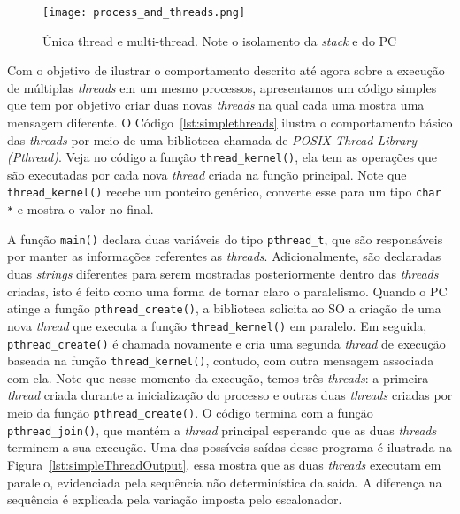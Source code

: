 \begin{figure}[!h]
  \centering
  \texttt{[image: process\_and\_threads.png]}
  \caption{Única thread e multi-thread. Note o isolamento da \emph{stack} e do PC~\citep{silberschatz}}
  \label{fig:single_thread_multi_thread}
\end{figure}

Com o objetivo de ilustrar o comportamento descrito até agora sobre a execução
de múltiplas \emph{threads} em um mesmo processos, apresentamos um código
simples que tem por objetivo criar duas novas \emph{threads} na qual cada uma
mostra uma mensagem diferente. O Código~\ref{lst:simplethreads} ilustra o
comportamento básico das \emph{threads} por meio de uma biblioteca chamada de
\emph{POSIX Thread Library (Pthread)}. Veja no código a função
\texttt{thread\_kernel()}, ela tem as operações que são executadas por cada nova
\emph{thread} criada na função principal. Note que \texttt{thread\_kernel()}
recebe um ponteiro genérico, converte esse para um tipo \texttt{char *} e
mostra o valor no final.




A função \texttt{main()} declara duas variáveis do tipo \texttt{pthread\_t},
que são responsáveis por manter as informações referentes as \emph{threads}.
Adicionalmente, são declaradas duas \emph{strings} diferentes para serem
mostradas posteriormente dentro das \emph{threads} criadas, isto é feito como
uma forma de tornar claro o paralelismo. Quando o PC atinge a função
\texttt{pthread\_create()}, a biblioteca solicita ao SO a criação de uma nova
\emph{thread} que executa a função \texttt{thread\_kernel()} em paralelo. Em
seguida, \texttt{pthread\_create()} é chamada novamente e cria uma segunda
\emph{thread} de execução baseada na função \texttt{thread\_kernel()}, contudo,
com outra mensagem associada com ela. Note que nesse momento da execução, temos
três \emph{threads}: a primeira \emph{thread} criada durante a inicialização do
processo e outras duas \emph{threads} criadas por meio da função
\texttt{pthread\_create()}. O código termina com a função
\texttt{pthread\_join()}, que mantém a \emph{thread} principal esperando que as
duas \emph{threads} terminem a sua execução. Uma das possíveis saídas desse
programa é ilustrada na Figura~\ref{lst:simpleThreadOutput}, essa mostra que as
duas \emph{threads} executam em paralelo, evidenciada pela sequência não
determinística da saída. A diferença na sequência é explicada pela variação
imposta pelo escalonador.

